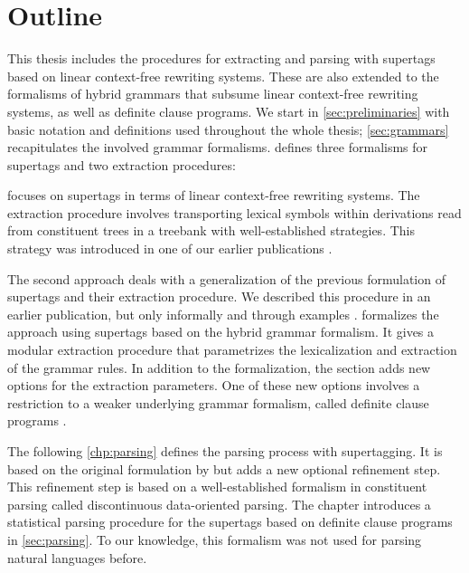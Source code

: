 \documentclass[../document.tex]{subfiles}
\begin{document}
    \section*{Outline}
    This thesis includes the procedures for extracting and parsing with supertags based on linear context-free rewriting systems.
    These are also extended to the formalisms of hybrid grammars that subsume linear context-free rewriting systems, as well as definite clause programs.
    We start in \cref{sec:preliminaries} with basic notation and definitions used throughout the whole thesis; \cref{sec:grammars} recapitulates the involved grammar formalisms.
     defines three formalisms for supertags and two extraction procedures:
    \begin{compactitem}
        \item {} focuses on supertags in terms of linear context-free rewriting systems.
            The extraction procedure involves transporting lexical symbols within derivations read from constituent trees in a treebank with well-established strategies.
            This strategy was introduced in one of our earlier publications \citep{RupMoe21}.
        \item The second approach deals with a generalization of the previous formulation of supertags and their extraction procedure.
            We described this procedure in an earlier publication, but only informally and through examples \citep{Rup22}.
             formalizes the approach using supertags based on the hybrid grammar formalism.
            It gives a modular extraction procedure that parametrizes the lexicalization and extraction of the grammar rules.
            In addition to the formalization, the section adds new options for the extraction parameters.
            One of these new options involves a restriction to a weaker underlying grammar formalism, called definite clause programs \citep{Der85}.
    \end{compactitem}
    The following \cref{chp:parsing} defines the parsing process with supertagging.
    It is based on the original formulation by \citet{bangalore1999supertagging} but adds a new optional refinement step.
    This refinement step is based on a well-established formalism in constituent parsing called discontinuous data-oriented parsing.
    The chapter introduces a statistical parsing procedure for the supertags based on definite clause programs in \cref{sec:parsing}. To our knowledge, this formalism was not used for parsing natural languages before.
\end{document}
